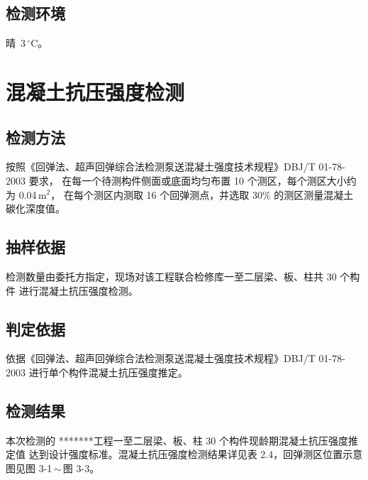 \documentclass[UTF8, zihao=-4, a4paper]{ctexart}
\newcommand{\projname}{*******工程}
\begin{document}
\subsection{检测环境}
晴~3\,$^{\circ}$C。

\section{混凝土抗压强度检测}

\subsection{检测方法}
按照《回弹法、超声回弹综合法检测泵送混凝土强度技术规程》DBJ/T 01-78-2003 要求，
在每一个待测构件侧面或底面均匀布置 10 个测区，每个测区大小约为 0.04\,m$^2$，
在每个测区内测取 16 个回弹测点，并选取 30\% 的测区测量混凝土碳化深度值。

\subsection{抽样依据}
检测数量由委托方指定，现场对该工程联合检修库一至二层梁、板、柱共 30 个构件
进行混凝土抗压强度检测。

\subsection{判定依据}
依据《回弹法、超声回弹综合法检测泵送混凝土强度技术规程》DBJ/T 01-78-2003
进行单个构件混凝土抗压强度推定。

\subsection{检测结果}
本次检测的 \projname 一至二层梁、板、柱 30 个构件现龄期混凝土抗压强度推定值
达到设计强度标准。混凝土抗压强度检测结果详见表 2.4，回弹测区位置示意图见图 3-1\,$\sim$\,图 3-3。
\end{document}
